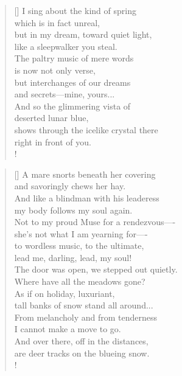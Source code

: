 \documentclass[]{article}
\begin{document}
\vspace*{0.05\textheight}
\settowidth{\versewidth}{The paltry music of mere words}
\begin{verse}[\versewidth]
I sing about the kind of spring\\
which is in fact unreal,\\
but in my dream, toward quiet light,\\
like a sleepwalker you steal.\\
The paltry music of mere words\\
is now not only verse,\\
but interchanges of our dreams\\
and secrets—mine, yours...\\
And so the glimmering vista of\\
deserted lunar blue,\\
shows through the icelike crystal there\\
right in front of you.\\!
\end{verse}
\bigskip \bigskip

\settowidth{\versewidth}{A mare snorts beneath her covering  }
\begin{verse}[\versewidth]
A mare snorts beneath her covering\\
and savoringly chews her hay.\\
And like a blindman with his leaderess\\
my body follows my soul again.\\
Not to my proud Muse for a rendezvous—- \\
she's not what I am yearning for—- \\
to wordless music, to the ultimate,\\
lead me, darling, lead, my soul!\\
The door was open, we stepped out quietly.\\
Where have all the meadows gone?\\
As if on holiday, luxuriant,\\
tall banks of snow stand all around...\\
From melancholy and from tenderness\\
I cannot make a move to go.\\
And over there, off in the distances,\\
are deer tracks on the blueing snow.\\!
\end{verse}
\newpage 
\end{document}
